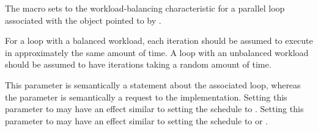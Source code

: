 \pnum
The
macro sets to
the workload-balancing characteristic
for a parallel loop associated with the object pointed to by
.

\pnum
For a loop with a balanced workload,
each iteration should be assumed to execute
in approximately the same amount of time.
A loop with an unbalanced workload
should be assumed to have iterations taking a random amount of time.

\begin{note}
This parameter is semantically a statement about the associated loop,
whereas the
parameter is semantically a request to the implementation.
Setting this parameter to
may have an effect similar to setting the schedule to
.
Setting this parameter to
may have an effect similar to setting the schedule to
or
.
\end{note}
